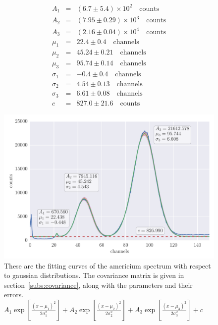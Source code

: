\begin{align*}
    A_1 &=& \left(6.7 \pm 5.4\right) \times 10^{2} \quad \mathrm{counts}\\
    A_2 &=& \left(7.95 \pm 0.29\right) \times 10^{3} \quad\mathrm{counts}\\
    A_3 &=& \left(2.16 \pm 0.04\right) \times 10^{4} \quad\mathrm{counts}\\
    \mu_1 &=& 22.4 \pm 0.4 \quad\mathrm{channels}\\
    \mu_2 &=& 45.24 \pm 0.21 \quad\mathrm{channels}\\
    \mu_3 &=& 95.74 \pm 0.14 \quad\mathrm{channels}\\
    \sigma_1 &=& -0.4 \pm 0.4 \quad\mathrm{channels}\\
    \sigma_2 &=& 4.54 \pm 0.13 \quad\mathrm{channels}\\
    \sigma_3 &=& 6.61 \pm 0.08 \quad\mathrm{channels}\\
    c &=& 827.0 \pm 21.6\quad \mathrm{counts}
\end{align*}
\begin{figure}[htpb]
    \centering
    \includegraphics[width=1.1\linewidth]{analysis/figures/plot6_3_reg}
    \caption{These are the fitting curves of the americium spectrum with respect to gaussian distributions. The covariance matrix
is given in section~\ref{subs:covariance}, along with the parameters and their errors.
        $A_1\exp{\left[\frac{(x-\mu_1)^2}{2 \sigma_1^2} \right]}+
         A_2\exp{\left[\frac{(x-\mu_2)^2}{2 \sigma_2^2} \right]}+
         A_3\exp{\left[\frac{(x-\mu_3)^2}{2 \sigma_3^2} \right]}+ c$}
         \label{fig:fit1}
\end{figure}


